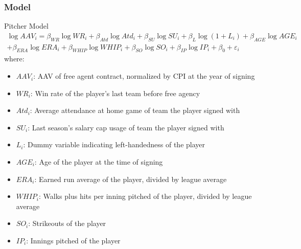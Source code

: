 \documentclass[9pt]{beamer}
\begin{document}
\begin{frame}
    \frametitle{Model}
    \begin{block}{Pitcher Model}
        \begin{multline}
            \log{AAV_{i}} = \beta_{WR} \log{WR_{i}}
                + \beta_{Atd} \log{Atd_{i}} 
                + \beta_{SU} \log{SU_{i}}
                + \beta_{L} \log{(1 + L_{i})}
                + \beta_{AGE}\log{AGE_{i}} \\
                + \beta_{ERA}\log{ERA_{i}}
                + \beta_{WHIP}\log{WHIP_{i}}
                + \beta_{SO}\log{SO_{i}}
                + \beta_{IP}\log{IP_{i}}
                + \beta_{0} 
                + \varepsilon_{i}
        \end{multline}
        where:
        \begin{itemize}
            \item $AAV_{i}$: AAV of free agent contract, normalized by CPI at the year of signing
            \item $WR_{i}$: Win rate of the player's last team before free agency
            \item $Atd_{i}$: Average attendance at home game of team the player signed with
            \item $SU_{i}$: Last season's salary cap usage of team the player signed with
            \item $L_{i}$: Dummy variable indicating left-handedness of the player
            \item $AGE_{i}$: Age of the player at the time of signing
            \item $ERA_{i}$: Earned run average of the player, divided by league average
            \item $WHIP_{i}$: Walks plus hits per inning pitched of the player, divided by league average
            \item $SO_{i}$: Strikeouts of the player
            \item $IP_{i}$: Innings pitched of the player
        \end{itemize}
    \end{block}
\end{frame}
\end{document}
